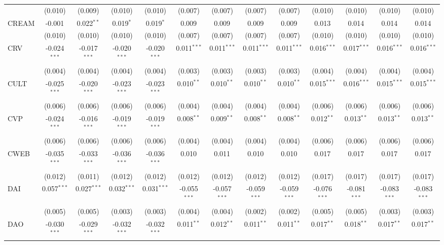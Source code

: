\begin{table}[!htbp]
\begin{tabular}{@{\extracolsep{5pt}}lcccccccccccc}
  & (0.010) & (0.009) & (0.010) & (0.010) & (0.007) & (0.007) & (0.007) & (0.007) & (0.010) & (0.010) & (0.010) & (0.010) \\
 CREAM & -0.001$^{}$ & 0.022$^{**}$ & 0.019$^{*}$ & 0.019$^{*}$ & 0.009$^{}$ & 0.009$^{}$ & 0.009$^{}$ & 0.009$^{}$ & 0.013$^{}$ & 0.014$^{}$ & 0.014$^{}$ & 0.014$^{}$ \\
  & (0.010) & (0.010) & (0.010) & (0.010) & (0.007) & (0.007) & (0.007) & (0.007) & (0.010) & (0.010) & (0.010) & (0.010) \\
 CRV & -0.024$^{***}$ & -0.017$^{***}$ & -0.020$^{***}$ & -0.020$^{***}$ & 0.011$^{***}$ & 0.011$^{***}$ & 0.011$^{***}$ & 0.011$^{***}$ & 0.016$^{***}$ & 0.017$^{***}$ & 0.016$^{***}$ & 0.016$^{***}$ \\
  & (0.004) & (0.004) & (0.004) & (0.004) & (0.003) & (0.003) & (0.003) & (0.003) & (0.004) & (0.004) & (0.004) & (0.004) \\
 CULT & -0.025$^{***}$ & -0.020$^{***}$ & -0.023$^{***}$ & -0.023$^{***}$ & 0.010$^{**}$ & 0.010$^{**}$ & 0.010$^{**}$ & 0.010$^{**}$ & 0.015$^{***}$ & 0.016$^{***}$ & 0.015$^{***}$ & 0.015$^{***}$ \\
  & (0.006) & (0.006) & (0.006) & (0.006) & (0.004) & (0.004) & (0.004) & (0.004) & (0.006) & (0.006) & (0.006) & (0.006) \\
 CVP & -0.024$^{***}$ & -0.016$^{***}$ & -0.019$^{***}$ & -0.019$^{***}$ & 0.008$^{**}$ & 0.009$^{**}$ & 0.008$^{**}$ & 0.008$^{**}$ & 0.012$^{**}$ & 0.013$^{**}$ & 0.013$^{**}$ & 0.013$^{**}$ \\
  & (0.006) & (0.006) & (0.006) & (0.006) & (0.004) & (0.004) & (0.004) & (0.004) & (0.006) & (0.006) & (0.006) & (0.006) \\
 CWEB & -0.035$^{***}$ & -0.033$^{***}$ & -0.036$^{***}$ & -0.036$^{***}$ & 0.010$^{}$ & 0.011$^{}$ & 0.010$^{}$ & 0.010$^{}$ & 0.017$^{}$ & 0.017$^{}$ & 0.017$^{}$ & 0.017$^{}$ \\
  & (0.012) & (0.011) & (0.012) & (0.012) & (0.012) & (0.012) & (0.012) & (0.012) & (0.017) & (0.017) & (0.017) & (0.017) \\
 DAI & 0.057$^{***}$ & 0.027$^{***}$ & 0.032$^{***}$ & 0.031$^{***}$ & -0.055$^{***}$ & -0.057$^{***}$ & -0.059$^{***}$ & -0.059$^{***}$ & -0.076$^{***}$ & -0.081$^{***}$ & -0.083$^{***}$ & -0.083$^{***}$ \\
  & (0.005) & (0.005) & (0.003) & (0.003) & (0.004) & (0.004) & (0.002) & (0.002) & (0.005) & (0.005) & (0.003) & (0.003) \\
 DAO & -0.030$^{***}$ & -0.029$^{***}$ & -0.032$^{***}$ & -0.032$^{***}$ & 0.011$^{**}$ & 0.012$^{**}$ & 0.011$^{**}$ & 0.011$^{**}$ & 0.017$^{**}$ & 0.018$^{**}$ & 0.017$^{**}$ & 0.017$^{**}$ \\

\end{tabular}
\end{table}
